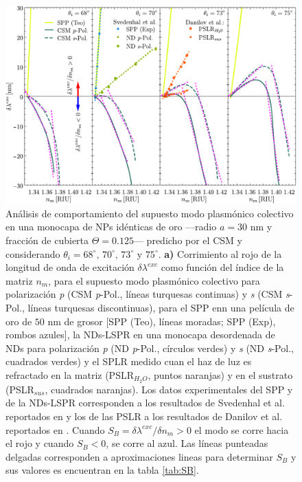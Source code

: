 \begin{figure}[b!]\centering
	\includegraphics[width=\linewidth]{2-Resultados/figs/11-SPPCSM/1_comparacionAugtEye.pdf}\vspace*{-.7em}
	\caption{ Análisis de comportamiento del supuesto modo  plasmónico colectivo en una monocapa de NPs idénticas de oro ---radio $a=30$ nm y fracción de cubierta $\Theta=0.125$--- predicho por el CSM y  considerando $\theta_i=68^\circ,\, 70^\circ,\, 73^\circ$ y $75^\circ$. \textbf{a)} Corrimiento al rojo de la longitud de onda de excitación $\delta\lambda^{exc}$ como función del índice de la matriz $n_m$, para el supuesto modo  plasmónico colectivo para polarización  \emph{p} (CSM \textit{p}-Pol., líneas turquesas continuas) y \emph{s} (CSM \textit{s}-Pol., líneas turquesas discontinuas), para el SPP enn una película de oro de $50$ nm de grosor [SPP (Teo), líneas moradas; SPP (Exp), rombos azules], la NDs-LSPR  en una monocapa desordenada de NDs para polarización \emph{p} (ND \textit{p}-Pol., círculos verdes) y \emph{s} (ND \textit{s}-Pol., cuadrados verdes) y el SPLR medido cuan el haz de luz es refractado en la matriz (PSLR$_{H_{2}O}$, puntos naranjas) y en el sustrato (PSLR$_{sus}$, cuadrados naranjas). Los datos experimentales del SPP y de la NDs-LSPR corresponden a los resultados de Svedenhal et al. reportados en \cite{svedendahl2009refractometric} y los de las PSLR a los resultados de Danilov et al. reportados en \cite{danilov2018ultra}. Cuando $S_B=\delta\lambda^{exc}/\delta n_m>0$ el modo se corre hacia el rojo y cuando $S_B<0$, se corre al azul. Las líneas punteadas delgadas corresponden a aproximaciones lineas para determinar $S_B$ y sus valores es encuentran en la tabla  \ref{tab:SB}.}\label{fig:SensThetai}
	\end{figure}	

